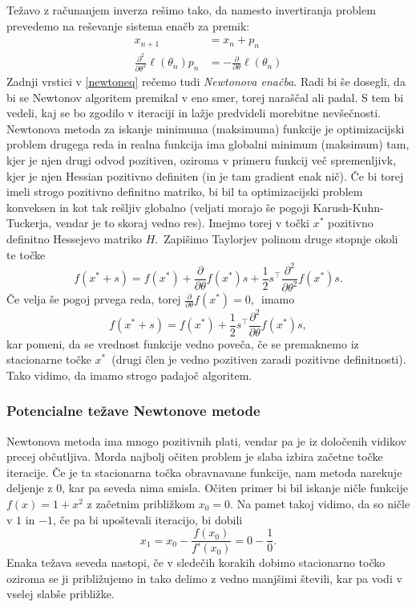 \documentclass[12pt,a4paper]{amsart}
\theoremstyle{definition} %
\theoremstyle{plain} %
\begin{document}
Težavo z računanjem inverza rešimo tako, da namesto invertiranja problem prevedemo na reševanje sistema enačb za premik:
\begin{align}\label{newtoneq}
    x_{n + 1} &= x_{n} + p_{n} \nonumber\\
    \frac{\partial^2}{\partial\theta^2}\ell(\theta_{n})p_{n} &= -\frac{\partial}{\partial\theta} \ell(\theta_{n})
\end{align}
Zadnji vrstici v \eqref{newtoneq} rečemo tudi \textit{Newtonova enačba}.
Radi bi še dosegli, da bi se Newtonov algoritem premikal v eno smer, torej naraščal ali padal. S tem bi vedeli, kaj se bo zgodilo v iteraciji in lažje predvideli morebitne
nevšečnosti. Newtonova metoda za iskanje minimuma (maksimuma) funkcije je optimizacijski problem drugega reda in realna funkcija ima globalni minimum (maksimum) tam, kjer je
njen drugi odvod pozitiven, oziroma v primeru funkcij več spremenljivk, kjer je njen Hessian pozitivno definiten (in je tam gradient enak nič). Če bi torej imeli
strogo pozitivno definitno matriko, bi bil ta optimizacijski problem konveksen in kot tak rešljiv globalno (veljati morajo še pogoji Karush-Kuhn-Tuckerja, vendar je to skoraj vedno res).
Imejmo torej v točki $x^{*}$ pozitivno definitno Hessejevo matriko $H.$~Zapišimo Taylorjev polinom druge stopnje okoli te točke
\[
    f(x^{*} + s) = f(x^{*}) + \frac{\partial}{\partial\theta} f(x^{*})s + \frac{1}{2}s^\top \frac{\partial^2}{\partial\theta^2}f(x^{*})s.
\]
Če velja še pogoj prvega reda, torej $\frac{\partial}{\partial\theta} f(x^{*}) = 0,$~imamo
\[
    f(x^{*} + s) = f(x^{*}) + \frac{1}{2}s^\top \frac{\partial^2}{\partial\theta}f(x^{*})s,
\]
kar pomeni, da se vrednost funkcije vedno poveča, če se premaknemo iz stacionarne točke $x^{*}$~(drugi člen je vedno pozitiven zaradi pozitivne definitnosti).
Tako vidimo, da imamo strogo padajoč algoritem.

\subsubsection{Potencialne težave Newtonove metode}
Newtonova metoda ima mnogo pozitivnih plati, vendar pa je iz določenih vidikov precej občutljiva. Morda najbolj očiten problem je slaba izbira začetne točke iteracije. Če je ta
stacionarna točka obravnavane funkcije, nam metoda narekuje deljenje z 0, kar pa seveda nima smisla. Očiten primer bi bil iskanje ničle funkcije $f(x) = 1+x^2$ z začetnim približkom $x_{0} = 0.$
Na pamet takoj vidimo, da so ničle v $1$ in $-1$, če pa bi upoštevali iteracijo, bi dobili
\[
    x_{1} = x_{0} - \frac{f(x_{0})}{f'(x_{0})} = 0 - \frac{1}{0}.   
\]
Enaka težava seveda nastopi, če v sledečih korakih dobimo stacionarno točko oziroma se ji približujemo in tako delimo z vedno manjšimi števili, kar pa vodi v vselej slabše približke.
\end{document}
